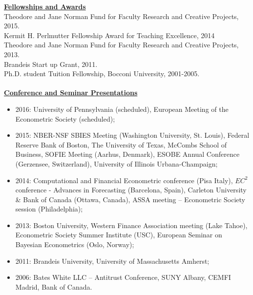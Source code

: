 \documentclass[12pt]{article}
\begin{document}
\underline{\textbf{Fellowships and Awards}}\\
Theodore and Jane Norman Fund for Faculty Research and Creative Projects, 2015. \\
Kermit H. Perlmutter Fellowship Award for Teaching Excellence, 2014 \\
Theodore and Jane Norman Fund for Faculty Research and Creative Projects, 2013. \\
Brandeis Start up Grant, 2011. \\
Ph.D. student Tuition Fellowship, Bocconi University, 2001-2005.\\ \\
\underline{\textbf{Conference and Seminar Presentations}}
\begin{itemize}
	\item 2016: University of Pennsylvania (scheduled), European Meeting of the Econometric Society (scheduled);
  \item 2015: NBER-NSF SBIES Meeting (Washington University, St. Louis), Federal Reserve Bank of Boston, The University of Texas, McCombs School of Business, SOFIE Meeting (Aarhus, Denmark), ESOBE Annual Conference (Gerzensee, Switzerland), University of Illinois Urbana-Champaign;
	\item 2014: Computational and Financial Econometric conference (Pisa Italy), $EC^2$ conference - Advances in Forecasting (Barcelona, Spain),  Carleton University & Bank of Canada (Ottawa, Canada), ASSA meeting -- Econometric Society session (Philadelphia);  
	\item 2013: Boston University, Western Finance Association meeting (Lake Tahoe), Econometric Society Summer Institute (USC), European Seminar on Bayesian Econometrics (Oslo, Norway); 
	\item 2011: Brandeis University, University of Massachusetts Amherst; 
	\item 2006: Bates White LLC -- Antitrust Conference, SUNY Albany, CEMFI Madrid, Bank of Canada.
\end{itemize}
\end{document}

